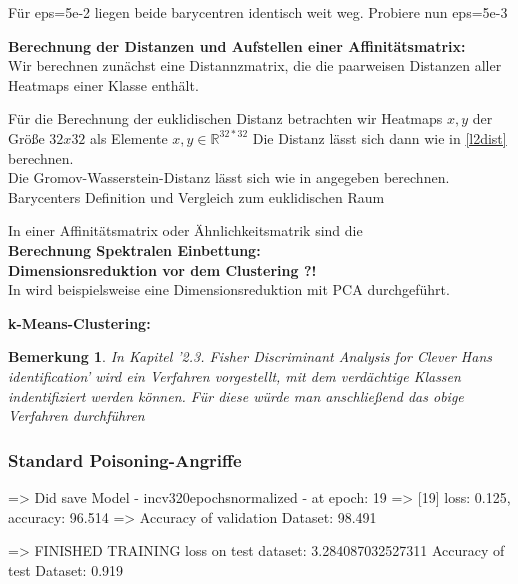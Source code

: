 \documentclass[twoside, 12pt,a4paper]{article}
\newtheorem{remark}[theorem]{Bemerkung}
\numberwithin{equation}{section}
\begin{document}
	Für eps=5e-2 liegen beide barycentren identisch weit weg. Probiere nun eps=5e-3
	
	\noindent \textbf{Berechnung der Distanzen und Aufstellen einer Affinitätsmatrix:}\\
	
	Wir berechnen zunächst eine Distannzmatrix, die die paarweisen Distanzen aller Heatmaps einer Klasse enthält.	
	
	Für die Berechnung der euklidischen Distanz betrachten wir Heatmaps $x,y$ der Größe $32x32$ als Elemente $x,y \in \mathbb{R}^{32*32}$ Die Distanz lässt sich dann wie in \autoref{l2dist} berechnen.\\
	
	Die Gromov-Wasserstein-Distanz lässt sich wie in \cite{gwd_averaging_kernels} angegeben berechnen. \\
	
	Barycenters Definition und Vergleich zum euklidischen Raum \cite{bary_wasserstein_space}
	
	In einer Affinitätsmatrix oder Ähnlichkeitsmatrik sind die \\
	
	\noindent \textbf{Berechnung Spektralen Einbettung:}\\
	
	\noindent \textbf{Dimensionsreduktion vor dem Clustering ?!}\\
	
	In \cite{AC} wird beispielsweise eine Dimensionsreduktion mit PCA durchgeführt.
	
	\noindent \textbf{k-Means-Clustering:}\\
	\begin{remark}
		In \cite{imagenet_unhansed_v1} Kapitel '2.3. Fisher Discriminant Analysis for Clever Hans
		identification' wird ein Verfahren vorgestellt, mit dem verdächtige Klassen indentifiziert werden können. Für diese würde man anschließend das obige Verfahren durchführen
	\end{remark}
	\subsubsection{Standard Poisoning-Angriffe}
	
	
	=> Did save Model - incv320epochsnormalized - at epoch: 19
	=>	[19] loss: 0.125, accuracy: 96.514%
	=>	Accuracy of validation Dataset: 98.491%
	
	=>	FINISHED TRAINING
	loss on test dataset: 3.284087032527311
	Accuracy of test Dataset: 0.919 
	
\end{document}
